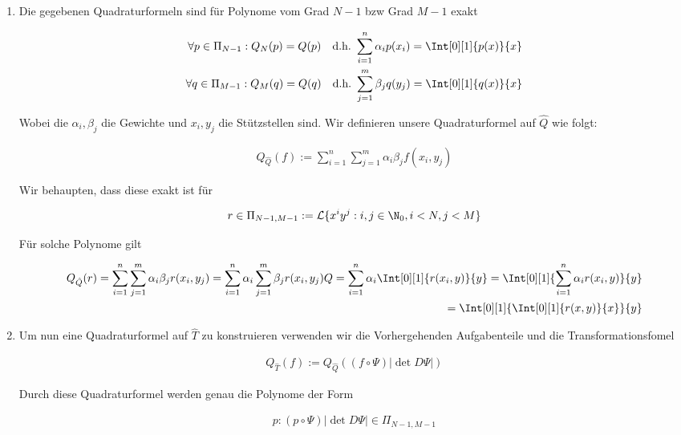 \begin{solution}
\begin{enumerate}[label = \textbf{\alph*)}]
  \item Die gegebenen Quadraturformeln sind für Polynome vom Grad $N-1$ bzw Grad $M-1$ exakt

  \begin{align*}
    \forall p \in \Pi_{N-1}:
    Q_N(p) = Q(p)
    \quad \text{d.h.}~
    \sum_{i = 1}^n \alpha_i p(x_i)
    =
    \Int[0][1]{p(x)}{x} \\
    \forall q \in \Pi_{M-1}:
    Q_M(q) = Q(q)
    \quad \text{d.h.}~
    \sum_{j = 1}^m \beta_j q(y_j)
    =
    \Int[0][1]{q(x)}{x}
  \end{align*}

  Wobei die $\alpha_i, \beta_j$ die Gewichte und $x_i, y_j$ die Stützstellen sind.
  Wir definieren unsere Quadraturformel auf $\hat{Q}$ wie folgt:

  \begin{align*}
    Q_{\hat{Q}}(f)
    :=
    \sum_{i=1}^n \sum_{j=1}^m \alpha_i \beta_j f(x_i, y_j)
  \end{align*}

  Wir behaupten, dass diese exakt ist für

  \begin{align*}
    r \in \Pi_{N-1,M-1} := \mathcal{L}\{x^i y^j: i,j \in \N_0, i < N, j < M\}
  \end{align*}

  Für solche Polynome gilt

  \begin{align*}
  Q_{\hat{Q}}(r)
  =
  \sum_{i=1}^n \sum_{j=1}^m \alpha_i \beta_j r(x_i, y_j)
  =
  \sum_{i=1}^n \alpha_i \sum_{j=1}^m \beta_j r(x_i, y_j)  Q
  =
  \sum_{i=1}^n \alpha_i \Int[0][1]{r(x_i,y)}{y}
  =
  \Int[0][1]{\sum_{i=1}^n \alpha_i r(x_i,y)}{y} \\
  =
  \Int[0][1]{
      \Int[0][1]{r(x,y)}{x}
            }{y}
  \end{align*}

  \item Um nun eine Quadraturformel auf $\hat{T}$ zu konstruieren verwenden wir die Vorhergehenden Aufgabenteile
  und die Transformationsfomel

  \begin{align*}
    Q_{\hat{T}}(f)
    :=
    Q_{\hat{Q}}((f\circ \Psi) |\det D\Psi|)
  \end{align*}

  Durch diese Quadraturformel werden genau die Polynome der Form

  \begin{align*}
    p: (p \circ \Psi) |\det D\Psi| \in \Pi_{N-1,M-1}
  \end{align*}


\end{enumerate}
\end{solution}
